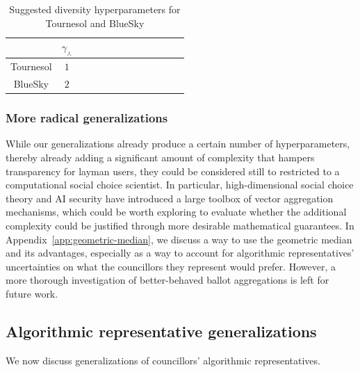 \begin{table}
\begin{center}
\begin{tabular}{ |c|c|c|c|c|c|c|c|c|c|c|c|c| } 
 \hline
            & $\gamma_\curlywedge$ \\ \hline
 Tournesol  & $1$ \\ \hline
 BlueSky    & $2$ \\ 
 \hline
\end{tabular}
\caption{Suggested diversity hyperparameters for Tournesol and BlueSky} 
\label{table:diversity_hyperparameters}
\end{center}
\end{table}

\subsubsection{More radical generalizations}

While our generalizations already produce a certain number of hyperparameters,
thereby already adding a significant amount of complexity 
that hampers transparency for layman users,
they could be considered still to restricted 
to a computational social choice scientist.
In particular, high-dimensional social choice theory and AI security have introduced
a large toolbox of vector aggregation mechanisms,
which could be worth exploring to evaluate 
whether the additional complexity could be justified 
through more desirable mathematical guarantees.
In Appendix~\ref{app:geometric-median}, 
we discuss a way to use the geometric median and its advantages,
especially as a way to account for algorithmic representatives' uncertainties
on what the councillors they represent would prefer.
However, a more thorough investigation of better-behaved ballot aggregations
is left for future work.


\subsection{Algorithmic representative generalizations}
\label{sec:algorithmic_representative_generalization}

We now discuss generalizations of councillors' algorithmic representatives.

